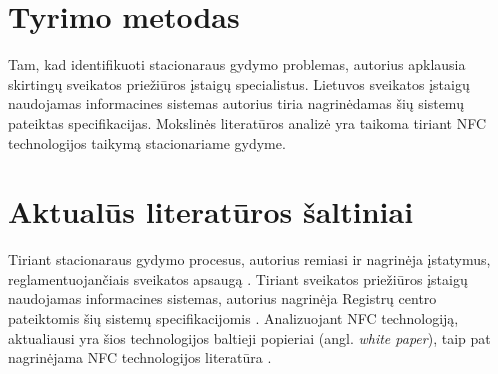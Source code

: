 \documentclass{VUMIFPSbakalaurinis}
\begin{document}
\section{Tyrimo metodas} 
Tam, kad identifikuoti stacionaraus gydymo problemas, autorius apklausia skirtingų sveikatos priežiūros įstaigų specialistus. Lietuvos sveikatos įstaigų naudojamas informacines sistemas autorius tiria nagrinėdamas šių sistemų pateiktas specifikacijas. Mokslinės literatūros analizė yra taikoma tiriant NFC technologijos taikymą stacionariame gydyme.

\section{Aktualūs literatūros šaltiniai} 
Tiriant stacionaraus gydymo procesus, autorius remiasi ir nagrinėja įstatymus, reglamentuojančiais sveikatos apsaugą \cite{StacionaroPaslaugos} \cite{Ministras2015}. Tiriant sveikatos priežiūros įstaigų naudojamas informacines sistemas, autorius nagrinėja Registrų centro pateiktomis šių sistemų specifikacijomis \cite{Specifikacija}. Analizuojant NFC technologiją, aktualiausi yra šios technologijos baltieji popieriai \cite{whitepapaer} (angl. \textit{white paper}), taip pat nagrinėjama NFC technologijos literatūra \cite{Leora1980}.

\newpage
% 

% 




\printbibliography[heading=bibintoc]  %
\end{document}
